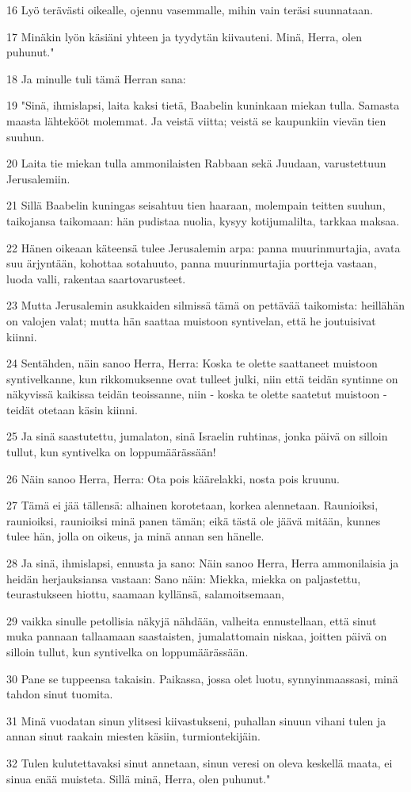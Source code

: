 \par 16 Lyö terävästi oikealle, ojennu vasemmalle, mihin vain teräsi suunnataan.
\par 17 Minäkin lyön käsiäni yhteen ja tyydytän kiivauteni. Minä, Herra, olen puhunut."
\par 18 Ja minulle tuli tämä Herran sana:
\par 19 "Sinä, ihmislapsi, laita kaksi tietä, Baabelin kuninkaan miekan tulla. Samasta maasta lähtekööt molemmat. Ja veistä viitta; veistä se kaupunkiin vievän tien suuhun.
\par 20 Laita tie miekan tulla ammonilaisten Rabbaan sekä Juudaan, varustettuun Jerusalemiin.
\par 21 Sillä Baabelin kuningas seisahtuu tien haaraan, molempain teitten suuhun, taikojansa taikomaan: hän pudistaa nuolia, kysyy kotijumalilta, tarkkaa maksaa.
\par 22 Hänen oikeaan käteensä tulee Jerusalemin arpa: panna muurinmurtajia, avata suu ärjyntään, kohottaa sotahuuto, panna muurinmurtajia portteja vastaan, luoda valli, rakentaa saartovarusteet.
\par 23 Mutta Jerusalemin asukkaiden silmissä tämä on pettävää taikomista: heillähän on valojen valat; mutta hän saattaa muistoon syntivelan, että he joutuisivat kiinni.
\par 24 Sentähden, näin sanoo Herra, Herra: Koska te olette saattaneet muistoon syntivelkanne, kun rikkomuksenne ovat tulleet julki, niin että teidän syntinne on näkyvissä kaikissa teidän teoissanne, niin - koska te olette saatetut muistoon - teidät otetaan käsin kiinni.
\par 25 Ja sinä saastutettu, jumalaton, sinä Israelin ruhtinas, jonka päivä on silloin tullut, kun syntivelka on loppumäärässään!
\par 26 Näin sanoo Herra, Herra: Ota pois käärelakki, nosta pois kruunu.
\par 27 Tämä ei jää tällensä: alhainen korotetaan, korkea alennetaan. Raunioiksi, raunioiksi, raunioiksi minä panen tämän; eikä tästä ole jäävä mitään, kunnes tulee hän, jolla on oikeus, ja minä annan sen hänelle.
\par 28 Ja sinä, ihmislapsi, ennusta ja sano: Näin sanoo Herra, Herra ammonilaisia ja heidän herjauksiansa vastaan: Sano näin: Miekka, miekka on paljastettu, teurastukseen hiottu, saamaan kyllänsä, salamoitsemaan,
\par 29 vaikka sinulle petollisia näkyjä nähdään, valheita ennustellaan, että sinut muka pannaan tallaamaan saastaisten, jumalattomain niskaa, joitten päivä on silloin tullut, kun syntivelka on loppumäärässään.
\par 30 Pane se tuppeensa takaisin. Paikassa, jossa olet luotu, synnyinmaassasi, minä tahdon sinut tuomita.
\par 31 Minä vuodatan sinun ylitsesi kiivastukseni, puhallan sinuun vihani tulen ja annan sinut raakain miesten käsiin, turmiontekijäin.
\par 32 Tulen kulutettavaksi sinut annetaan, sinun veresi on oleva keskellä maata, ei sinua enää muisteta. Sillä minä, Herra, olen puhunut."

